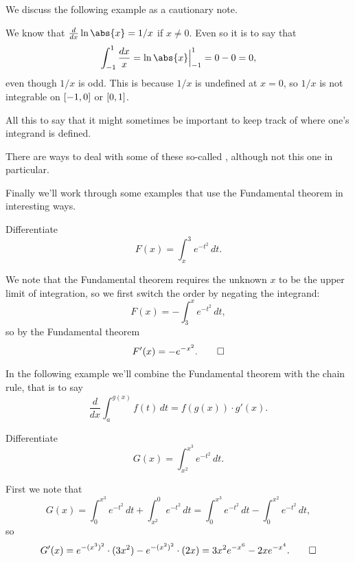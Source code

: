 \noindent
We discuss the following example as a cautionary note.

\begin{counterexample}
	We know that $\frac{d}{d x} \ln\abs{x} = 1/x$ if $x \neq 0$.
	Even so it is  to say that
	\[
		\int_{-1}^1 \frac{d x}{x} = \ln\abs{x} \Big \rvert_{-1}^1 = 0 - 0 = 0,
	\]
	even though $1/x$ is odd.
	This is because $1/x$ is undefined at $x = 0$, so $1/x$ is not integrable on $\interval{-1}{0}$ or $\interval{0}{1}$.

	All this to say that it might sometimes be important to keep track of where one's integrand is defined.

	There are ways to deal with some of these so-called , although not this one in particular.
\end{counterexample}

\noindent
Finally we'll work through some examples that use the Fundamental theorem in interesting ways.

\begin{example}
	Differentiate
	\[
		F(x) = \int_x^3 e^{-t^2} \, d t.
	\]

	\noindent
	We note that the Fundamental theorem requires the unknown $x$ to be the upper limit of integration, so we first switch the order by negating the integrand:
	\[
		F(x) = - \int_3^x e^{-t^2} \, d t,
	\]
	so by the Fundamental theorem
	\[
		F'(x) = - e^{-x^2}. \qedhere
	\]
\end{example}

\noindent
In the following example we'll combine the Fundamental theorem with the chain rule, that is to say
\[
	\frac{d}{d x} \int_a^{g(x)} f(t) \, d t = f(g(x)) \cdot g'(x).
\]

\begin{example}
	Differentiate
	\[
		G(x) = \int_{x^2}^{x^3} e^{-t^2} \, d t.
	\]

	\noindent
	First we note that
	\[
		G(x) = \int_0^{x^3} e^{-t^2} \, d t + \int_{x^2}^0 e^{-t^2} \, d t = \int_0^{x^3} e^{-t^2} \, d t - \int_0^{x^2} e^{-t^2} \, d t,
	\]
	so
	\[
		G'(x) = e^{-(x^3)^2} \cdot (3 x^2) - e^{-(x^2)^2} \cdot (2 x) = 3x^2 e^{-x^6} - 2xe^{-x^4}. \qedhere
	\]
\end{example}
